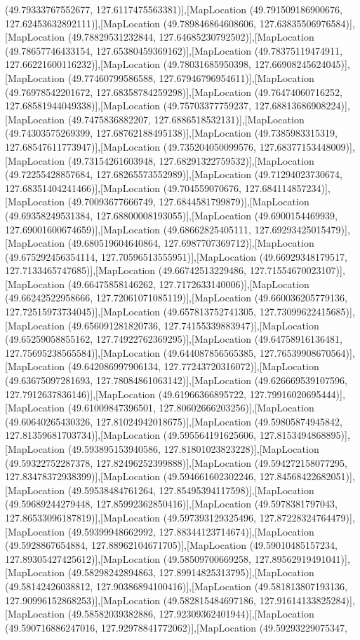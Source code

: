(49.79333767552677, 127.6117475563381)],[MapLocation (49.791509186900676, 127.62453632892111)],[MapLocation (49.789846864608606, 127.63835506976584)],[MapLocation (49.78829531232844, 127.64685230792502)],[MapLocation (49.78657746433154, 127.65380459369162)],[MapLocation (49.78375119474911, 127.66221600116232)],[MapLocation (49.78031685950398, 127.66908245624045)],[MapLocation (49.77460799586588, 127.67946796954611)],[MapLocation (49.76978542201672, 127.68358784259298)],[MapLocation (49.76474060716252, 127.68581944049338)],[MapLocation (49.75703377759237, 127.68813686908224)],[MapLocation (49.7475836882207, 127.6886518532131)],[MapLocation (49.74303575269399, 127.68762188495138)],[MapLocation (49.7385983315319, 127.68547611773947)],[MapLocation (49.735204050099576, 127.68377153448009)],[MapLocation (49.73154261603948, 127.68291322759532)],[MapLocation (49.72255428857684, 127.68265573552989)],[MapLocation (49.71294023730674, 127.68351404241466)],[MapLocation (49.704559070676, 127.684114857234)],[MapLocation (49.70093677666749, 127.6844581799879)],[MapLocation (49.69358249531384, 127.68800008193055)],[MapLocation (49.6900154469939, 127.69001600674659)],[MapLocation (49.68662825405111, 127.69293425015479)],[MapLocation (49.680519604640864, 127.6987707369712)],[MapLocation (49.675292456354114, 127.70596513555951)],[MapLocation (49.66929348179517, 127.7133465747685)],[MapLocation (49.66742513229486, 127.71554670023107)],[MapLocation (49.66475858146262, 127.7172633140006)],[MapLocation (49.66242522958666, 127.72061071085119)],[MapLocation (49.660036205779136, 127.72515973734045)],[MapLocation (49.657813752741305, 127.73099622415685)],[MapLocation (49.656091281820736, 127.74155339883947)],[MapLocation (49.65259058855162, 127.74922762369295)],[MapLocation (49.64758916136481, 127.75695238565584)],[MapLocation (49.644087856565385, 127.76539908670564)],[MapLocation (49.642086997906134, 127.77243720316072)],[MapLocation (49.63675097281693, 127.78084861063142)],[MapLocation (49.626669539107596, 127.7912637836146)],[MapLocation (49.61966366895722, 127.79916020695444)],[MapLocation (49.61009847396501, 127.80602666203256)],[MapLocation (49.60640265430326, 127.81024942018675)],[MapLocation (49.59805874945842, 127.81359681703734)],[MapLocation (49.595564191625606, 127.8153494868895)],[MapLocation (49.593895153940586, 127.81801023823228)],[MapLocation (49.59322752287378, 127.82496252399888)],[MapLocation (49.594272158077295, 127.83478372938399)],[MapLocation (49.594661602302246, 127.84568422682051)],[MapLocation (49.59538484761264, 127.85495394117598)],[MapLocation (49.59689244279448, 127.85992362850416)],[MapLocation (49.5978381797043, 127.86533096187819)],[MapLocation (49.597393129325496, 127.87228324764479)],[MapLocation (49.59399948662992, 127.88344123714674)],[MapLocation (49.5928867654884, 127.88962104671705)],[MapLocation (49.59010485157234, 127.89305427425612)],[MapLocation (49.58509700669258, 127.89562919491041)],[MapLocation (49.58298242894863, 127.89914825313795)],[MapLocation (49.58142426038812, 127.90386894100416)],[MapLocation (49.581813807193136, 127.90996152868253)],[MapLocation (49.582815484697186, 127.91614133825284)],[MapLocation (49.58582039382886, 127.92309362401944)],[MapLocation (49.590716886247016, 127.92978841772062)],[MapLocation (49.59293229075347, 
